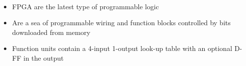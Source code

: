 \documentclass[a4paper]{article}
\begin{document}
\begin{defi}
\ 
\begin{itemize}
\item FPGA are the latest type of programmable logic
\item Are a sea of programmable wiring and function blocks controlled by bits downloaded from memory
\item Function units contain a 4-input 1-output look-up table with an optional D-FF in the output
\end{itemize}
\end{defi}
\end{document}
